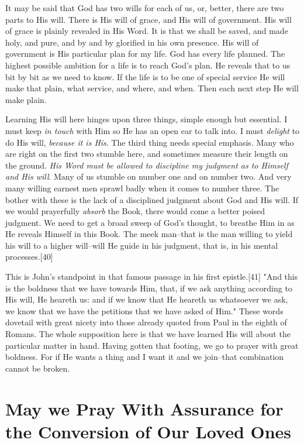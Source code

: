 It may be said that God has two wills for each of us, or, better, there
are two parts to His will. There is His will of grace, and His will of
government. His will of grace is plainly revealed in His Word. It is that
we shall be saved, and made holy, and pure, and by and by glorified in his
own presence. His will of government is His particular plan for my life.
God has every life planned. The highest possible ambition for a life is to
reach God's plan. He reveals that to us bit by bit as we need to know. If
the life is to be one of special service He will make that plain, what
service, and where, and when. Then each next step He will make plain.

Learning His will here hinges upon three things, simple enough but
essential. I must keep \textit{in touch} with Him so He has an open ear to talk
into. I must \textit{delight} to do His will, \textit{because it is His}. The third
thing needs special emphasis. Many who are right on the first two stumble
here, and sometimes measure their length on the ground. \textit{His Word must be
allowed to discipline my judgment as to Himself and His will}. Many of us
stumble on number one and on number two. And very many willing earnest men
sprawl badly when it comes to number three. The bother with these is the
lack of a disciplined judgment about God and His will. If we would
prayerfully \textit{absorb} the Book, there would come a better poised judgment.
We need to get a broad sweep of God's thought, to breathe Him in as He
reveals Himself in this Book. The meek man--that is the man willing to
yield his will to a higher will--will He guide in his judgment, that is,
in his mental processes.[40]

This is John's standpoint in that famous passage in his first epistle.[41]
"And this is the boldness that we have towards Him, that, if we ask
anything according to His will, He heareth us: and if we know that He
heareth us whatsoever we ask, we know that we have the petitions that we
have asked of Him." These words dovetail with great nicety into those
already quoted from Paul in the eighth of Romans. The whole supposition
here is that we have learned His will about the particular matter in hand.
Having gotten that footing, we go to prayer with great boldness. For if He
wants a thing and I want it and we join--that combination cannot be
broken.




\chapter{May we Pray With Assurance for the Conversion of Our Loved Ones}



